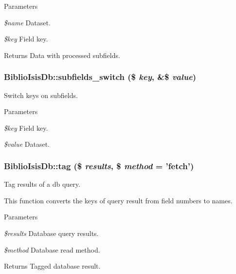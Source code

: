 \begin{DoxyParams}{Parameters}
\item[{\em \$name}]Dataset.\item[{\em \$key}]Field key.\end{DoxyParams}
\begin{DoxyReturn}{Returns}
Data with processed subfields. 
\end{DoxyReturn}
\hypertarget{classBiblioIsisDb_af0be305b211b96dcb4aeb8452c8331a9}{
\subsubsection[{subfields\_\-switch}]{\setlength{\rightskip}{0pt plus 5cm}BiblioIsisDb::subfields\_\-switch (\$ {\em key}, \/  \&\$ {\em value})}}
\label{classBiblioIsisDb_af0be305b211b96dcb4aeb8452c8331a9}
Switch keys on subfields.


\begin{DoxyParams}{Parameters}
\item[{\em \$key}]Field key.\item[{\em \$value}]Dataset. \end{DoxyParams}
\hypertarget{classBiblioIsisDb_a34483b463d81ba1d8031576b5735efbc}{
\subsubsection[{tag}]{\setlength{\rightskip}{0pt plus 5cm}BiblioIsisDb::tag (\$ {\em results}, \/  \$ {\em method} = {\ttfamily 'fetch'})}}
\label{classBiblioIsisDb_a34483b463d81ba1d8031576b5735efbc}
Tag results of a db query.

This function converts the keys of query result from field numbers to names.


\begin{DoxyParams}{Parameters}
\item[{\em \$results}]Database query results.\item[{\em \$method}]Database read method.\end{DoxyParams}
\begin{DoxyReturn}{Returns}
Tagged database result. 
\end{DoxyReturn}


